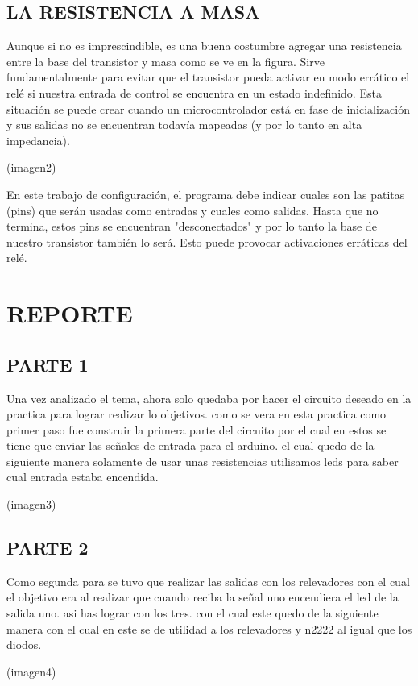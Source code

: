 \documentclass[12pt,letterpaper]{article}
\begin{document}
\subsection{LA RESISTENCIA A MASA}
	Aunque si no es imprescindible, es una buena costumbre agregar una resistencia entre la base
	del transistor y masa como se ve en la figura. Sirve fundamentalmente para evitar que el transistor pueda activar en modo errático el relé si nuestra entrada de control se encuentra en
	un estado indefinido. Esta situación se puede crear cuando un microcontrolador está en fase
	de inicialización y sus salidas no se encuentran todavía mapeadas (y por lo tanto en alta
	impedancia).
	\begin{center}
		(imagen2)
	\end{center}
	En este trabajo de configuración, el programa debe indicar
	cuales son las patitas (pins) que serán usadas como entradas y cuales como salidas. Hasta que
	no termina, estos pins se encuentran "desconectados" y por lo tanto la base de nuestro
	transistor también lo será. Esto puede provocar activaciones erráticas del relé.
\section{REPORTE}
	\subsection{PARTE 1}
	Una vez analizado el tema, ahora solo quedaba por hacer el circuito deseado en la practica para lograr realizar lo objetivos. como se vera en esta practica como primer paso fue construir la primera parte del circuito por el cual en estos se tiene que enviar las señales de entrada para el arduino. el cual quedo de la siguiente manera solamente de usar unas resistencias utilisamos leds para saber cual entrada estaba encendida.
	\begin{center}
		(imagen3)
	\end{center}
	\subsection{PARTE 2}
	Como segunda para se tuvo que realizar las salidas con los relevadores con el cual el objetivo era al realizar que cuando reciba la señal uno encendiera el led de la salida uno. asi has lograr con los tres. con el cual este quedo de la siguiente manera con el cual en este se de utilidad a los relevadores y n2222 al igual que los diodos.\\
	\begin{center}
		(imagen4)
	\end{center}
\end{document}
